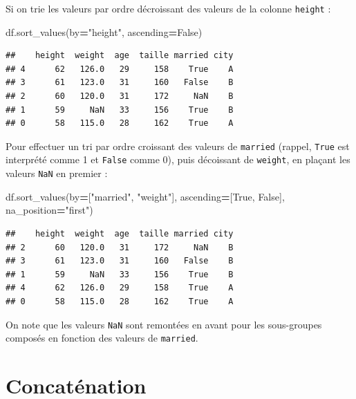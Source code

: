 \documentclass[
  12pt,
]{book}
\newenvironment{Shaded}{\begin{snugshade}}{\end{snugshade}}
\newcommand{\NormalTok}[1]{#1}
\newcommand{\OperatorTok}[1]{\textcolor[rgb]{0.81,0.36,0.00}{\textbf{#1}}}
\newcommand{\StringTok}[1]{\textcolor[rgb]{0.31,0.60,0.02}{#1}}
\newcommand{\VariableTok}[1]{\textcolor[rgb]{0.00,0.00,0.00}{#1}}
\numberwithin{equation}{section}
\numberwithin{countremarque}{section}
\begin{document}
Si on trie les valeurs par ordre décroissant des valeurs de la colonne \texttt{height} :

\begin{Shaded}
\begin{Highlighting}[]
\NormalTok{df.sort\_values(by}\OperatorTok{=}\StringTok{"height"}\NormalTok{, ascending}\OperatorTok{=}\VariableTok{False}\NormalTok{)}
\end{Highlighting}
\end{Shaded}

\begin{lstlisting}
##    height  weight  age  taille married city
## 4      62   126.0   29     158    True    A
## 3      61   123.0   31     160   False    B
## 2      60   120.0   31     172     NaN    B
## 1      59     NaN   33     156    True    B
## 0      58   115.0   28     162    True    A
\end{lstlisting}

Pour effectuer un tri par ordre croissant des valeurs de \texttt{married} (rappel, \texttt{True} est interprété comme 1 et \texttt{False} comme 0), puis décoissant de \texttt{weight}, en plaçant les valeurs \texttt{NaN} en premier :

\begin{Shaded}
\begin{Highlighting}[]
\NormalTok{df.sort\_values(by}\OperatorTok{=}\NormalTok{[}\StringTok{"married"}\NormalTok{, }\StringTok{"weight"}\NormalTok{],}
\NormalTok{               ascending}\OperatorTok{=}\NormalTok{[}\VariableTok{True}\NormalTok{, }\VariableTok{False}\NormalTok{],}
\NormalTok{               na\_position}\OperatorTok{=}\StringTok{"first"}\NormalTok{)}
\end{Highlighting}
\end{Shaded}

\begin{lstlisting}
##    height  weight  age  taille married city
## 2      60   120.0   31     172     NaN    B
## 3      61   123.0   31     160   False    B
## 1      59     NaN   33     156    True    B
## 4      62   126.0   29     158    True    A
## 0      58   115.0   28     162    True    A
\end{lstlisting}

On note que les valeurs \texttt{NaN} sont remontées en avant pour les sous-groupes composés en fonction des valeurs de \texttt{married}.

\section{Concaténation}\label{concatuxe9nation}
\end{document}
